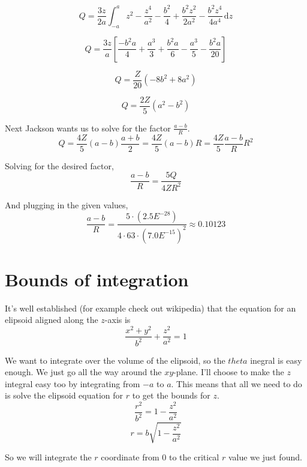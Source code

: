 \documentclass[10pt,a4paper]{article}
\begin{document}
\begin{equation}
Q=\frac{3z}{2a}\int_{-a}^a z^2-\frac{z^4}{a^2}-\frac{b^2}{4}+\frac{b^2z^2}{2a^2}-\frac{b^2z^4}{4a^4}\,\mathrm{d}z
\end{equation}

\begin{equation}
Q=\frac{3z}{a}\left[\frac{-b^2a}{4}+\frac{a^3}{3}+\frac{b^2a}{6}-\frac{a^3}{5}-\frac{b^2a}{20}\right]
\end{equation}

\begin{equation}
Q=\frac{Z}{20}(-8b^2+8a^2)
\end{equation}

\begin{equation}
\boxed{
Q=\frac{2Z}{5}(a^2-b^2)
}
\end{equation}

Next Jackson wants us to solve for the factor $\frac{a-b}{R}$.
\begin{equation}
Q=\frac{4Z}{5}(a-b)\frac{a+b}{2}=\frac{4Z}{5}(a-b)R=\frac{4Z}{5}\frac{a-b}{R}R^2
\end{equation}

Solving for the desired factor,
\begin{equation}
\frac{a-b}{R}=\frac{5Q}{4ZR^2}
\end{equation}

And plugging in the given values,
\begin{equation}
\frac{a-b}{R}=\frac{5\cdot(2.5 E^{-28})}{4\cdot 63\cdot(7.0 E^{-15})^2} \approx0.10123
\end{equation}

\appendix
\section{Bounds of integration}
It's well established (for example check out wikipedia) that the equation for an elipsoid aligned along the $z$-axis is
\begin{equation}
\frac{x^2+y^2}{b^2}+\frac{z^2}{a^2}=1
\end{equation}

We want to integrate over the volume of the elipsoid, so the $theta$ inegral is easy enough.  We just go all the way around the $xy$-plane.  I'll choose to make the $z$ integral easy too by integrating from $-a$ to $a$.  This means that all we need to do is solve the elipsoid equation for $r$ to get the bounds for $z$.
\begin{equation}
\frac{r^2}{b^2}=1-\frac{z^2}{a^2}
\end{equation}
\begin{equation}
r=b\sqrt{1-\frac{z^2}{a^2}}
\end{equation}

So we will integrate the $r$ coordinate from $0$ to the critical $r$ value we just found.
\end{document}
